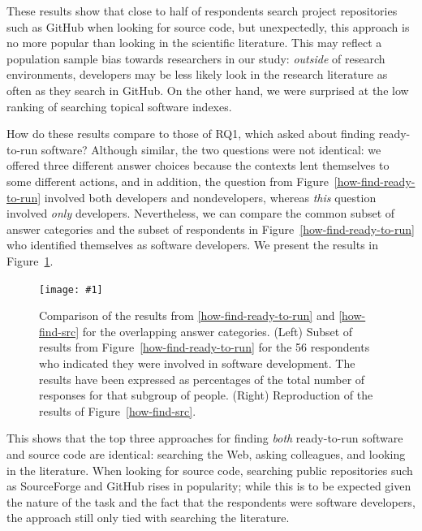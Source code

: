 \documentclass[review]{elsarticle}
\newcommand{\totalDevelopers}{56\xspace}
\newcommand{\includefile}[1]{\texttt{[image: \#1]}}
\begin{document}
These results show that close to half of respondents search project repositories such as GitHub when looking for source code, but unexpectedly, this approach is no more popular than looking in the scientific literature.  This may reflect a population sample bias towards researchers in our study: \emph{outside} of research environments, developers may be less likely look in the research literature as often as they search in GitHub.  On the other hand, we were surprised at the low ranking of searching topical software indexes.


How do these results compare to those of RQ1, which asked about finding ready-to-run software?  Although similar, the two questions were not identical: we offered three different answer choices because the contexts lent themselves to some different actions, and in addition, the question from Figure~\ref{how-find-ready-to-run} involved both developers and nondevelopers, whereas \emph{this} question involved \emph{only} developers.  Nevertheless, we can compare the common subset of answer categories and the subset of respondents in Figure~\ref{how-find-ready-to-run} who identified themselves as software developers.  We present the results in Figure~\ref{compare-how-find}.

\begin{figure}[bht]
  \centering
  \includefile{files/plots/compare-how-find-v2.pdf}
  \caption{Comparison of the results from \ref{how-find-ready-to-run} and \ref{how-find-src} for the overlapping answer categories. (Left) Subset of results from Figure~\ref{how-find-ready-to-run} for the \totalDevelopers respondents who indicated they were involved in software development.  The results have been expressed as percentages of the total number of responses for that subgroup of people.  (Right) Reproduction of the results of Figure~\ref{how-find-src}.}
  \label{compare-how-find}
\end{figure}

This shows that the top three approaches for finding \emph{both} ready-to-run software and source code are identical: searching the Web, asking colleagues, and looking in the literature.  When looking for source code, searching public repositories such as SourceForge and GitHub rises in popularity; while this is to be expected given the nature of the task and the fact that the respondents were software developers, the approach still only tied with searching the literature.
\end{document}

